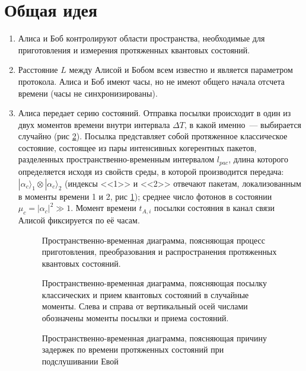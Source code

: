 \section[Общая схема протокола]{Общая идея}\label{sec:common_description}

\begin{enumerate}
  \item Алиса и Боб контролируют области пространства, необходимые для приготовления и измерения протяженных квантовых состояний.
  \item Расстояние $L$ между Алисой и Бобом всем известно и является параметром протокола. Алиса и Боб имеют часы, но не имеют общего начала отсчета времени (часы не синхронизированы).
  \item Алиса передает серию состояний. Отправка посылки происходит в один из двух моментов времени внутри интервала $\Delta T$, в какой именно~--- выбирается случайно (рис \ref{fig:timeline}). 
  Посылка представляет собой протяженное классическое состояние, состоящее из пары интенсивных когерентных пакетов, разделенных пространственно-временным интервалом $l_{pac}$, длина которого определяется исходя из свойств среды, в которой производится передача: 
  $|\alpha_c\rangle_1 \otimes|\alpha_c\rangle_2$ (индексы <<1>> и <<2>> отвечают пакетам, локализованным в моменты времени 1 и 2, рис \ref{fig:process}); среднее число фотонов в состоянии $\mu_c = |\alpha_c|^2 \gg 1$. 
  Момент времени $t_{A,i}$ посылки состояния в канал связи Алисой фиксируется по её часам.
  
  \begin{figure}[h]
  \caption{Пространственно-временная диаграмма, поясняющая процесс приготовления, преобразования и распространения протяженных квантовых состояний.}
  \label{fig:process}
  \end{figure}
  \begin{figure}[h]
  \caption{Пространственно-временная диаграмма, поясняющая посылку классических и прием квантовых состояний в случайные моменты. Слева и справа от вертикальный осей числами обозначены моменты посылки и приема состояний. }
  \label{fig:timeline}
  \end{figure}
  \begin{figure}[h]
  \caption{Пространственно-временная диаграмма, поясняющая причину задержек по времени протяженных состояний при подслушивании Евой}
  \label{fig:detected}
  \end{figure}
  

\end{enumerate}
